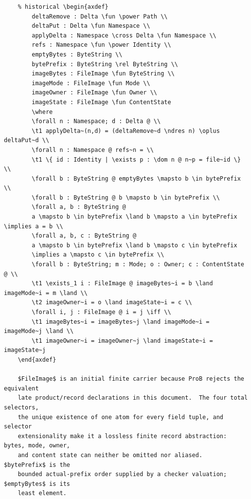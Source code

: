 \documentclass{article}
\begin{document}
\begin{verbatim}
	% historical \begin{axdef}
		deltaRemove : Delta \fun \power Path \\
		deltaPut : Delta \fun Namespace \\
		applyDelta : Namespace \cross Delta \fun Namespace \\
		refs : Namespace \fun \power Identity \\
		emptyBytes : ByteString \\
		bytePrefix : ByteString \rel ByteString \\
		imageBytes : FileImage \fun ByteString \\
		imageMode : FileImage \fun Mode \\
		imageOwner : FileImage \fun Owner \\
		imageState : FileImage \fun ContentState
		\where
		\forall n : Namespace; d : Delta @ \\
		\t1 applyDelta~(n,d) = (deltaRemove~d \ndres n) \oplus deltaPut~d \\
		\forall n : Namespace @ refs~n = \\
		\t1 \{ id : Identity | \exists p : \dom n @ n~p = file~id \} \\
		\forall b : ByteString @ emptyBytes \mapsto b \in bytePrefix \\
		\forall b : ByteString @ b \mapsto b \in bytePrefix \\
		\forall a, b : ByteString @
		a \mapsto b \in bytePrefix \land b \mapsto a \in bytePrefix \implies a = b \\
		\forall a, b, c : ByteString @
		a \mapsto b \in bytePrefix \land b \mapsto c \in bytePrefix
		\implies a \mapsto c \in bytePrefix \\
		\forall b : ByteString; m : Mode; o : Owner; c : ContentState @ \\
		\t1 \exists_1 i : FileImage @ imageBytes~i = b \land imageMode~i = m \land \\
		\t2 imageOwner~i = o \land imageState~i = c \\
		\forall i, j : FileImage @ i = j \iff \\
		\t1 imageBytes~i = imageBytes~j \land imageMode~i = imageMode~j \land \\
		\t1 imageOwner~i = imageOwner~j \land imageState~i = imageState~j
	\end{axdef}

	$FileImage$ is an initial finite carrier because ProB rejects the equivalent
	late product/record declarations in this document.  The four total selectors,
	the unique existence of one atom for every field tuple, and selector
	extensionality make it a lossless finite record abstraction: bytes, mode, owner,
	and content state can neither be omitted nor aliased.  $bytePrefix$ is the
	bounded actual-prefix order supplied by a checker valuation; $emptyBytes$ is its
	least element.


\end{verbatim}
\end{document}
